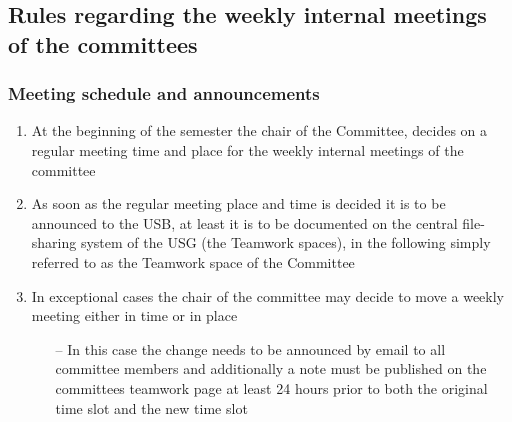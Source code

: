 \subsection[Meeting]{Rules regarding the weekly internal meetings of the committees}\label{provision:internal meetings}
\subsubsection{Meeting schedule and announcements}
\begin{enumerate}
	\item At the beginning of the semester the chair of the Committee, decides on a regular meeting time and place for the weekly internal meetings of the committee\\
	\item As soon as the regular meeting place and time is decided it is to be announced to the USB, at least it is to be documented on the central file-sharing system of the USG (the Teamwork spaces), in the following simply referred to as the Teamwork space of the Committee
	\item In exceptional cases the chair of the committee may decide to move a weekly meeting either in time or in place \begin{itemize}
		\item[--] In this case the change needs to be announced by email to all committee members and additionally a note must be published on the committees teamwork page at least 24 hours prior to both the original time slot and the new time slot
	\end{itemize}
\end{enumerate}
